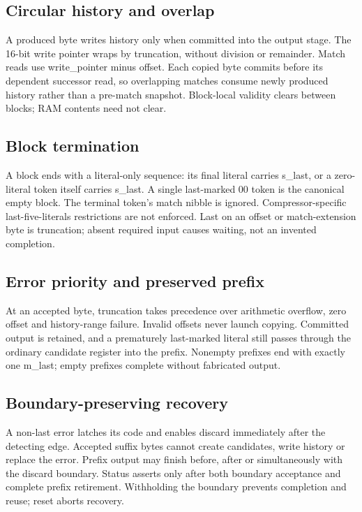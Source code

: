 \documentclass[11pt,a4paper]{article}
\begin{document}
\subsection{Circular history and overlap}

A produced byte writes history only when committed into the output stage. The 16-bit write pointer wraps by truncation,\allowbreak{} without division or remainder. Match reads use write\_\allowbreak{}pointer minus offset. Each copied byte commits before its dependent successor read,\allowbreak{} so overlapping matches consume newly produced history rather than a pre-match snapshot. Block-local validity clears between blocks; RAM contents need not clear.

\subsection{Block termination}

A block ends with a literal-only sequence: its final literal carries s\_\allowbreak{}last,\allowbreak{} or a zero-literal token itself carries s\_\allowbreak{}last. A single last-marked 00 token is the canonical empty block. The terminal token's match nibble is ignored. Compressor-specific last-five-literals restrictions are not enforced. Last on an offset or match-extension byte is truncation; absent required input causes waiting,\allowbreak{} not an invented completion.

\subsection{Error priority and preserved prefix}

At an accepted byte,\allowbreak{} truncation takes precedence over arithmetic overflow,\allowbreak{} zero offset and history-range failure. Invalid offsets never launch copying. Committed output is retained,\allowbreak{} and a prematurely last-marked literal still passes through the ordinary candidate register into the prefix. Nonempty prefixes end with exactly one m\_\allowbreak{}last; empty prefixes complete without fabricated output.

\subsection{Boundary-preserving recovery}

A non-last error latches its code and enables discard immediately after the detecting edge. Accepted suffix bytes cannot create candidates,\allowbreak{} write history or replace the error. Prefix output may finish before,\allowbreak{} after or simultaneously with the discard boundary. Status asserts only after both boundary acceptance and complete prefix retirement. Withholding the boundary prevents completion and reuse; reset aborts recovery.
\end{document}

